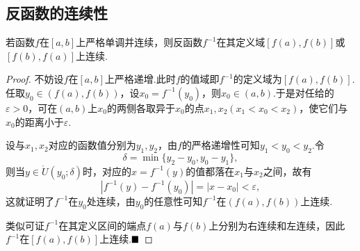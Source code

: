 \subsection{反函数的连续性}
\begin{theorem}
	若函数$f$在$\left[a,b\right]$上{\heiti 严格单调并连续}，则反函数$f^{-1}$在其定义域$\left[f(a),f(b)\right]$或$\left[f(b),f(a)\right]$上连续.
\end{theorem}
\begin{proof}
	不妨设$f$在$\left[a,b\right]$上严格递增.此时$f$的值域即$f^{-1}$的定义域为$\left[f(a),f(b)\right]$.任取$y_0\in(f(a),f(b))$，设$x_0=f^{-1}(y_0)$，则$x_0\in(a,b)$.于是对任给的$\varepsilon>0$，可在$(a,b)$上$x_0$的两侧各取异于$x_0$的点$x_1,x_2(x_1<x_0<x_2)$，使它们与$x_0$的距离小于$\varepsilon$.
	
	设与$x_1,x_2$对应的函数值分别为$y_1,y_2$，由$f$的严格递增性可知$y_1<y_0<y_2$.令
	$$\delta=\min\{y_2-y_0,y_0-y_1\},$$
	则当$y\in\mathring{U}(y_0;\delta)$时，对应的$x=f^{-1}(y)$的值都落在$x_1$与$x_2$之间，故有
	$$|f^{-1}(y)-f^{-1}(y_0)|=|x-x_0|<\varepsilon,$$
	这就证明了$f^{-1}$在$y_0$处连续，由$y_0$的任意性可知$f^{-1}$在$(f(a),f(b))$上连续.
	
	类似可证$f^{-1}$在其定义区间的端点$f(a)$与$f(b)$上分别为右连续和左连续，因此$f^{-1}$在$\left[f(a),f(b)\right]$上连续.$\hfill\blacksquare$
\end{proof}
